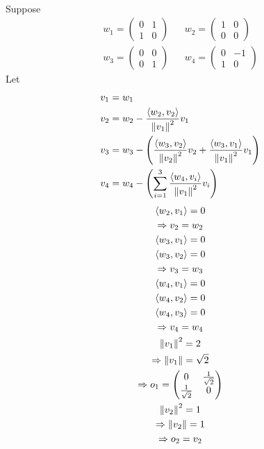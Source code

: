 \begin{enumerate}
\begin{itemize}
\begin{gather}
\end{gather}
Suppose
\begin{align}
w_1 = \begin{pmatrix} 0 & 1\\1 & 0\end{pmatrix} & & w_2
= \begin{pmatrix}1 & 0 \\0 & 0 \end{pmatrix} \\
w_3 = \begin{pmatrix} 0 & 0 \\ 0 & 1\end{pmatrix} & &
w_4 =\begin{pmatrix} 0 & -1\\ 1 & 0\end{pmatrix}
\end{align}
Let
\begin{align}
v_1 &= w_1\\
v_2 &= w_2 - \frac{\langle w_2,v_2\rangle}{\left\lVert v_1\right\rVert^2}v_1\\
v_3 &= w_3 - \left(\frac{\langle w_3,v_2\rangle}{\left\lVert v_2\right\rVert^2}v_2 +
  \frac{\langle w_3,v_1\rangle}{\left\lVert v_1\right\rVert^2}v_1\right)\\
v_4 &= w_4 -\left(\sum\limits_{i=1}^3\frac{\langle w_4,v_i\rangle}{\left\lVert v_1\right\rVert^2}v_i\right)
\end{align}
\begin{gather}
\langle w_2,v_1\rangle = 0\\
\implies v_2 = w_2\\
\langle w_3,v_1\rangle = 0\\
\langle w_3,v_2\rangle = 0\\
\implies v_3 = w_3\\
\langle w_4,v_1\rangle = 0\\
\langle w_4,v_2\rangle = 0\\
\langle w_4,v_3\rangle = 0\\
\implies v_4 = w_4\\
\norm{v_1}^2 = 2\\
\implies \norm{v_1} = \sqrt{2}\\
\implies o_1 = \begin{pmatrix}
0 & \frac{1}{\sqrt{2}}\\
\frac{1}{\sqrt{2}} & 0
\end{pmatrix}\\
\norm{v_2}^2 = 1\\
\implies \norm{v_2} = 1\\
\implies o_2 = v_2\\

\end{gather}
\end{itemize}
\end{enumerate}
